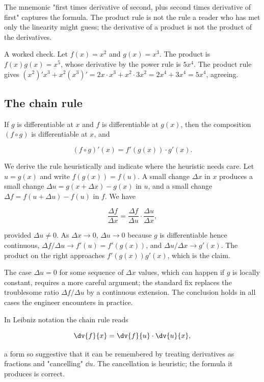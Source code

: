 The mnemonic "first times derivative of second, plus second times
derivative of first" captures the formula. The product rule is
not the rule a reader who has met only the linearity might guess;
the derivative of a product is not the product of the derivatives.

A worked check. Let $f(x) = x^{2}$ and $g(x) = x^{3}$. The
product is $f(x) g(x) = x^{5}$, whose derivative by the power
rule is $5 x^{4}$. The product rule gives $(x^{2})' x^{3} + x^{2}
(x^{3})' = 2 x \cdot x^{3} + x^{2} \cdot 3 x^{2} = 2 x^{4} + 3
x^{4} = 5 x^{4}$, agreeing.

\subsection{The chain rule}

\begin{theorem}
If $g$ is differentiable at $x$ and $f$ is differentiable at
$g(x)$, then the composition $(f \circ g)$ is differentiable at
$x$, and

\[
(f \circ g)'(x) = f'(g(x)) \cdot g'(x).
\]
\end{theorem}

We derive the rule heuristically and indicate where the heuristic
needs care. Let $u = g(x)$ and write $f(g(x)) = f(u)$. A small
change $\Delta x$ in $x$ produces a small change $\Delta u =
g(x + \Delta x) - g(x)$ in $u$, and a small change $\Delta f =
f(u + \Delta u) - f(u)$ in $f$. We have

\[
\frac{\Delta f}{\Delta x} = \frac{\Delta f}{\Delta u} \cdot
\frac{\Delta u}{\Delta x},
\]

provided $\Delta u \neq 0$. As $\Delta x \to 0$, $\Delta u \to 0$
because $g$ is differentiable hence continuous, $\Delta f / \Delta
u \to f'(u) = f'(g(x))$, and $\Delta u / \Delta x \to g'(x)$. The
product on the right approaches $f'(g(x)) g'(x)$, which is the
claim.

The case $\Delta u = 0$ for some sequence of $\Delta x$ values,
which can happen if $g$ is locally constant, requires a more
careful argument; the standard fix replaces the troublesome ratio
$\Delta f / \Delta u$ by a continuous extension. The conclusion
holds in all cases the engineer encounters in practice.

In Leibniz notation the chain rule reads

\[
\dv{f}{x} = \dv{f}{u} \cdot \dv{u}{x},
\]

a form so suggestive that it can be remembered by treating
derivatives as fractions and "cancelling" $\dd u$. The cancellation
is heuristic; the formula it produces is correct.

